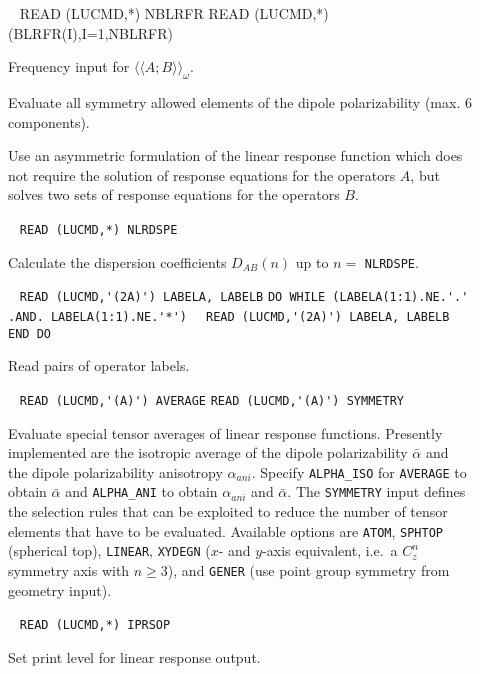 \begin{description}
%
%
\item[] \verb| |\newline
READ (LUCMD,*) NBLRFR
READ (LUCMD,*) (BLRFR(I),I=1,NBLRFR)

Frequency input for $\langle\langle A;B \rangle\rangle_{\omega}$.
 
\item[] 
Evaluate all symmetry allowed elements of the dipole polarizability
(max. 6 components).
%
%
%
\item[] 
Use an asymmetric formulation of the linear response function which
does not require the solution of response equations for the operators $A$, 
but solves two sets of response equations for the operators $B$.
%
\item[] \verb| |\newline
   \verb|READ (LUCMD,*) NLRDSPE|

   Calculate the dispersion coefficients 
   $D_{AB}(n)$ up to $n = $ \verb+NLRDSPE+.
%
\item[] \verb| |\newline
   \verb|READ (LUCMD,'(2A)') LABELA, LABELB|\newline
   \verb|DO WHILE (LABELA(1:1).NE.'.' .AND. LABELA(1:1).NE.'*')|\newline
   \verb|  READ (LUCMD,'(2A)') LABELA, LABELB|\newline
   \verb|END DO|

Read pairs of operator labels. 
 
\item[] \verb| |\newline
   \verb|READ (LUCMD,'(A)') AVERAGE|\newline
   \verb|READ (LUCMD,'(A)') SYMMETRY|

Evaluate special tensor averages of linear response functions.
Presently implemented are the isotropic average of the dipole polarizability
$\bar{\alpha}$ and the dipole polarizability anisotropy $\alpha_{ani}$.
Specify \verb+ALPHA_ISO+ for \verb+AVERAGE+ to obtain $\bar{\alpha}$ and
\verb+ALPHA_ANI+ to obtain $\alpha_{ani}$ and $\bar{\alpha}$.
The \verb+SYMMETRY+ input defines the selection rules that can be
exploited to reduce the number of tensor elements that have to be
evaluated. Available options are
\verb+ATOM+, \verb+SPHTOP+ (spherical top), \verb+LINEAR+,
\verb+XYDEGN+ ($x$- and $y$-axis equivalent, i.e.\ a $C_z^n$
symmetry axis with $n \ge 3$),  and \verb+GENER+ (use point
group symmetry from geometry input).
 
\item[] \verb| |\newline
   \verb|READ (LUCMD,*) IPRSOP|

   Set print level for linear response output.
 
\end{description}
